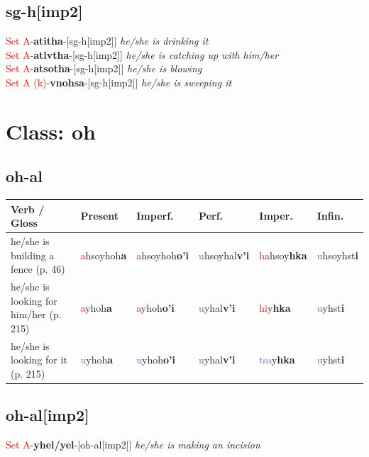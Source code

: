 \documentclass[oneside,openany]{book}%
\begin{document}
\subsection*{sg-h[imp2]}%
\textcolor{Red}{Set A}{-}\textbf{atitha}{-}[sg-h[imp2]] \textit{ he/she is drinking it} \\%
\textcolor{Red}{Set A}{-}\textbf{atlvtha}{-}[sg-h[imp2]] \textit{ he/she is catching up with him/her} \\%
\textcolor{Red}{Set A}{-}\textbf{atsotha}{-}[sg-h[imp2]] \textit{ he/she is blowing} \\%
\textcolor{Red}{Set A (k)}{-}\textbf{vnohsa}{-}[sg-h[imp2]] \textit{ he/she is sweeping it} \\%
\vspace{1em}%
\needspace{3in}%
\section*{Class: oh}%
%
\needspace{1in}%
\subsection*{oh-al}%
\begin{tabularx}{\textwidth}{>{\hsize=1.5\hsize\RaggedRight}X >{\hsize=0.9\hsize}X >{\hsize=0.9\hsize}X >{\hsize=0.9\hsize}X >{\hsize=0.9\hsize}X >{\hsize=0.9\hsize}X}%
\toprule%
\textbf{Verb / Gloss}&\textbf{Present}&\textbf{Imperf.}&\textbf{Perf.}&\textbf{Imper.}&\textbf{Infin.}\\%
\midrule%
he/she is building a fence (p. 46)&\textcolor{Red}{a}hsoyhoh\textbf{a}&\textcolor{Red}{a}hsoyhoh\textbf{o'i}&\textcolor{RoyalBlue}{u}hsoyhal\textbf{v'i}&\textcolor{Red}{h}ahsoy\textbf{hka}&\textcolor{RoyalBlue}{u}hsoyhst\textbf{i}\\%
he/she is looking for him/her (p. 215)&\textcolor{Red}{a}yhoh\textbf{a}&\textcolor{Red}{a}yhoh\textbf{o'i}&\textcolor{RoyalBlue}{u}yhal\textbf{v'i}&\textcolor{Red}{hi}y\textbf{hka}&\textcolor{RoyalBlue}{u}yhst\textbf{i}\\%
he/she is looking for it (p. 215)&\textcolor{RoyalBlue}{u}yhoh\textbf{a}&\textcolor{RoyalBlue}{u}yhoh\textbf{o'i}&\textcolor{RoyalBlue}{u}yhal\textbf{v'i}&\textcolor{RoyalBlue}{tsa}y\textbf{hka}&\textcolor{RoyalBlue}{u}yhst\textbf{i}\\%
\bottomrule%
\end{tabularx}%
\vspace{1em}%
\needspace{1in}%
\subsection*{oh-al[imp2]}%
\textcolor{Red}{Set A}{-}\textbf{yhel/yel}{-}[oh-al[imp2]] \textit{ he/she is making an incision} \\%
\vspace{1em}%
\needspace{1in}%
\end{document}
